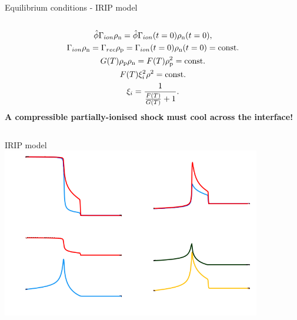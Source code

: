 \documentclass[10pt,aspectratio=169,usenames,dvipsnames]{beamer}
\begin{document}
\begin{frame}{Equilibrium conditions - IRIP model}
\begin{columns}
\begin{column}{0.55\textwidth}
\begin{gather}
    \hat{\phi} \Gamma _{ion} \rho_{\rm n} = \hat{\phi} \Gamma _{ion} (t=0) \rho _{\rm n} (t=0), \\
    \Gamma _{ion} \rho_{\rm n} = \Gamma _{rec} \rho_{\rm p} = \Gamma _{ion} (t=0) \rho _{\rm n} (t=0) =\mbox{const.} \\
    G(T)\rho_{\rm p} \rho_{\rm n} = F(T) \rho_{\rm p} ^2 = \mbox{const.} \\
    F(T) \xi_i ^2 \rho ^2 = \mbox{const.} \\
     \xi_i=\frac{1}{\frac{F(T)}{G(T)} +1}.
\end{gather}
\textbf{A compressible partially-ionised shock must cool across the interface!}
\end{column}
\end{columns}
\end{frame}

\begin{frame}{IRIP model}
\includegraphics[width=0.85\textwidth]{2023StAndrewsAstro/Figures/irip_shock.png}
\end{frame}
\end{document}
